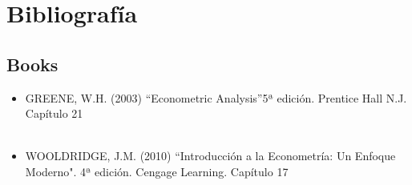 \documentclass[11pt,fleqn]{book} %
\numberwithin{equation}{section} %
\numberwithin{figure}{section} %
\numberwithin{table}{section} %
\begin{document}


\chapter*{Bibliografía}
\section*{Books}
\printbibliography[heading=bibempty,type=book]

\begin{itemize}
	\item GREENE, W.H. (2003) “Econometric Analysis”5ª edición. Prentice Hall N.J. Capítulo 21
\\\\
    \item WOOLDRIDGE, J.M. (2010) “Introducción a la Econometría: Un Enfoque Moderno". 4ª edición. Cengage Learning. Capítulo 17

\end{itemize}



\cleardoublepage
{}
\setlength{\columnsep}{0.75cm}
\printindex

\end{document}
